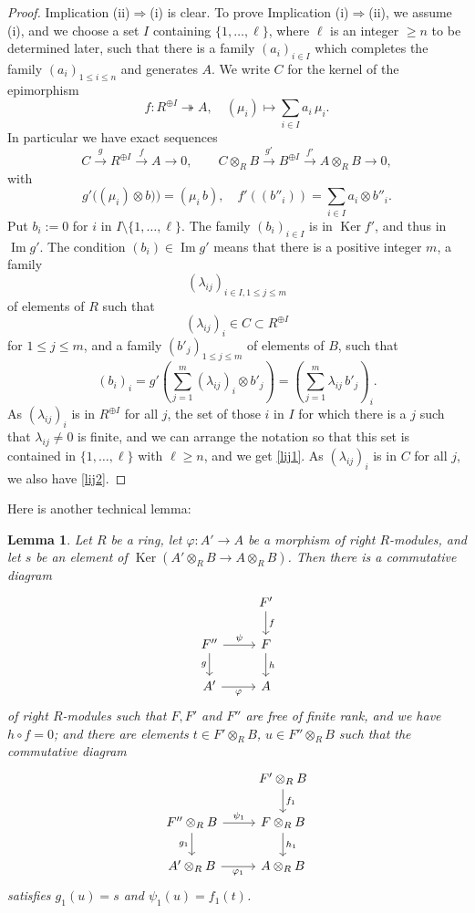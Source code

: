 \documentclass[12pt]{article}
\newtheorem{lem}[thm]{Lemma}
\theoremstyle{remark}
\theoremstyle{definition}
\newcommand{\pp}{\varphi}
\newcommand{\epi}{\twoheadrightarrow}
\newcommand{\then}{\Rightarrow}
\newcommand{\xr}{\xrightarrow}
\DeclareMathOperator{\Ima}{Im}
\DeclareMathOperator{\Ker}{Ker}
\begin{document}
\begin{proof} 
Implication (ii)$\then$(i) is clear. To prove Implication (i)$\then$(ii), we assume (i), and we choose a set $I$ containing $\{1,\dots,\ell\}$, where $\ell$ is an integer $\ge n$ to be determined later, such that there is a family $(a_i)_{i\in I}$ which completes the family $(a_i)_{1\le i\le n}$ and generates $A$. We write $C$ for the kernel of the epimorphism 
$$
f:R^{\oplus I}\epi A,\quad(\mu_i)\mapsto\sum_{i\in I}a_i\,\mu_i.
$$ 
In particular we have exact sequences 
$$
C\xr gR^{\oplus I}\xr fA\to0,\qquad C\otimes_RB\xr{g'}B^{\oplus I}\xr{f'}A\otimes_RB\to0,
$$ 
with 
$$
g'\big((\mu_i)\otimes b)\big)=(\mu_i\,b),\quad f'((b''_i))=\sum_{i\in I}a_i\otimes b''_i.
$$
Put $b_i:=0$ for $i$ in $I\setminus\{1,\dots,\ell\}$. The family $(b_i)_{i\in I}$ is in $\Ker f'$, and thus in $\Ima g'$. The condition $(b_i)\in\Ima g'$ means that there is a positive integer $m$, a family 
$$
(\lambda_{ij})_{i\in I,1\le j\le m}
$$ 
of elements of $R$ such that 
$$
(\lambda_{ij})_i\in C\subset R^{\oplus I}
$$ 
for $1\le j\le m$, and a family $(b'_j)_{1\le j\le m}$ of elements of $B$, such that 
$$
(b_i)_i=g'
\left(\sum_{j=1}^m(\lambda_{ij})_i\otimes b'_j\right)=
\left(\sum_{j=1}^m\lambda_{ij}\,b'_j\right)_i.
$$ 
As $(\lambda_{ij})_i$ is in $R^{\oplus I}$ for all $j$, the set of those $i$ in $I$ for which there is a $j$ such that $\lambda_{ij}\neq0$ is finite, and we can arrange the notation so that this set is contained in $\{1,\dots,\ell\}$ with $\ell\ge n$, and we get \eqref{lij1}. As $(\lambda_{ij})_i$ is in $C$ for all $j$, we also have \eqref{lij2}. 
\end{proof} 

Here is another technical lemma:

\begin{lem}\label{techlem2}
Let $R$ be a ring, let $\pp:A'\to A$ be a morphism of right $R$-modules, and let $s$ be an element of $\Ker(A'\otimes_RB\to A\otimes_RB)$. Then there is a commutative diagram 
$$
\begin{tikzcd}
{}&F'\ar{d}{f}\\ 
F''\ar{r}{\psi}\ar{d}[swap]{g}&F\ar{d}{h}\\ 
A'\ar{r}[swap]{\pp}&A
\end{tikzcd}
$$  
of right $R$-modules such that $F,F'$ and $F''$ are free of finite rank, and we have $h\circ f=0$; and there are elements $t\in F'\otimes_RB$, $u\in F''\otimes_RB$ such that the commutative diagram 
$$
\begin{tikzcd}
{}&F'\otimes_RB\ar{d}{f_1}\\ 
F''\otimes_RB\ar{r}{\psi_1}\ar{d}[swap]{g_1}&F\otimes_RB\ar{d}{h_1}\\ 
A'\otimes_RB\ar{r}[swap]{\pp_1}&A\otimes_RB
\end{tikzcd}
$$  
satisfies $g_1(u)=s$ and $\psi_1(u)=f_1(t)$. 
\end{lem} 
\end{document}
